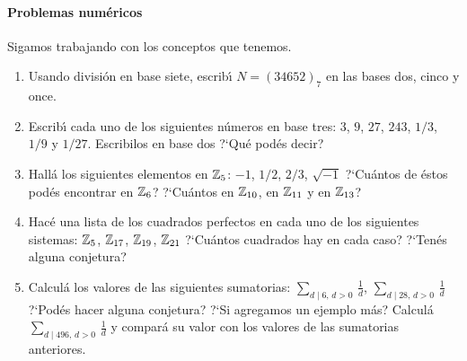 \paragraph{Problemas num\'ericos}
Sigamos trabajando con los conceptos que tenemos.
\begin{enumerate}[label=P\arabic*]
	\conti
	\item\label{item:bases:cambiar}
		Usando divisi\'on en base siete, escrib\'{\i}
		$N=(34652)_7$ en las bases dos, cinco y once.
	\item\label{item:bases:escribir}
		Escrib\'{\i} cada uno de los siguientes n\'umeros
		en base tres: $3$, $9$, $27$, $243$, $1/3$, $1/9$
		y $1/27$. Escribilos en base dos ?`Qu\'e pod\'es
		decir?
	\item\label{item:modulares:varios}
		Hall\'a los siguientes elementos en $\Enterosmod[5]$:
		$-1$, $1/2$, $2/3$, $\sqrt{-1}$ ?`Cu\'antos de
		\'estos pod\'es encontrar en $\Enterosmod[6]$?
		?`Cu\'antos en $\Enterosmod[10]$, en $\Enterosmod[11]$
		y en $\Enterosmod[13]$?
	\item\label{item:modulares:cuadrados}
		Hac\'e una lista de los cuadrados perfectos en cada uno
		de los siguientes sistemas: $\Enterosmod[5]$,
		$\Enterosmod[17]$, $\Enterosmod[19]$,
		$\Enterosmod[21]$ ?`Cu\'antos cuadrados hay en cada
		caso? ?`Ten\'es alguna conjetura?
	\item\label{item:divisores:perfectos}
		Calcul\'a los valores de las siguientes sumatorias:
		\begin{math}
			\sum_{d\mid 6,\,d>0}\,\frac 1 d
		\end{math},
		\begin{math}
			\sum_{d\mid 28,\,d>0}\,\frac 1 d
		\end{math}
		?`Pod\'es hacer alguna conjetura?
		?`Si agregamos un ejemplo m\'as?
		Calcul\'a
		\begin{math}
			\sum_{d\mid 496,\,d>0}\,\frac 1 d
		\end{math}
		y compar\'a su valor con los valores de las sumatorias
		anteriores.
	\seti
\end{enumerate}
%

